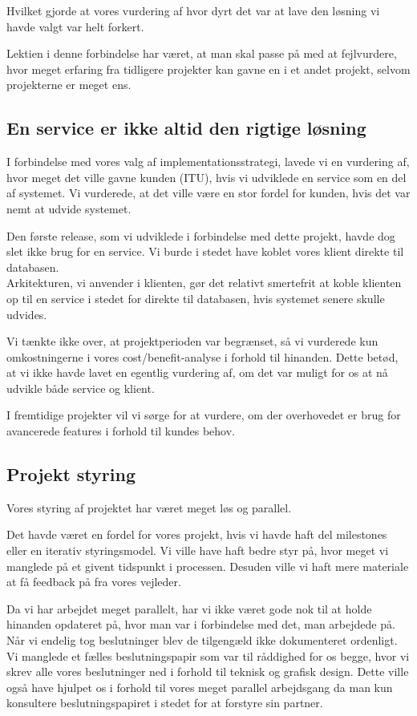 Hvilket gjorde at vores vurdering af hvor dyrt det var at lave den løsning vi havde valgt var helt forkert.

Lektien i denne forbindelse har været, at man skal passe på med at fejlvurdere, hvor meget erfaring fra tidligere projekter kan gavne en i et andet projekt, selvom projekterne er meget ens.

\subsection{En service er ikke altid den rigtige løsning}
\label{Conclusion_Lessons_Service}
I forbindelse med vores valg af implementationsstrategi, lavede vi en vurdering af, hvor meget det ville gavne kunden (ITU), hvis vi udviklede en service som en del af systemet. Vi vurderede, at det ville være en stor fordel for kunden, hvis det var nemt at udvide systemet.

Den første release, som vi udviklede i forbindelse med dette projekt, havde dog slet ikke brug for en service. Vi burde i stedet have koblet vores klient direkte til databasen. 
\\Arkitekturen, vi anvender i klienten, gør det relativt smertefrit at koble klienten op til en service i stedet for direkte til databasen, hvis systemet senere skulle udvides.

Vi tænkte ikke over, at projektperioden var begrænset, så vi vurderede kun omkostningerne i vores cost/benefit-analyse i forhold til hinanden. Dette betød, at vi ikke havde lavet en egentlig vurdering af, om det var muligt for os at nå udvikle både service og klient.

I fremtidige projekter vil vi sørge for at vurdere, om der overhovedet er brug for avancerede features i forhold til kundes behov.

\subsection{Projekt styring}
\label{Conclusion_Lessons_Styring}
Vores styring af projektet har været meget løs og parallel. 

Det havde været en fordel for vores projekt, hvis vi havde haft del milestones eller en iterativ styringsmodel. Vi ville have haft bedre styr på, hvor meget vi manglede på et givent tidspunkt i processen. Desuden ville vi haft mere materiale at få feedback på fra vores vejleder.

Da vi har arbejdet meget parallelt, har vi ikke været gode nok til at holde hinanden opdateret på, hvor man var i forbindelse med det, man arbejdede på. Når vi endelig tog beslutninger blev de tilgengæld ikke dokumenteret ordenligt. Vi manglede et fælles beslutningspapir som var til råddighed for os begge, hvor vi skrev alle vores beslutninger ned i forhold til teknisk og grafisk design.
Dette ville også have hjulpet os i forhold til vores meget parallel arbejdsgang da man kun konsultere beslutningspapiret i stedet for at forstyre sin partner.

